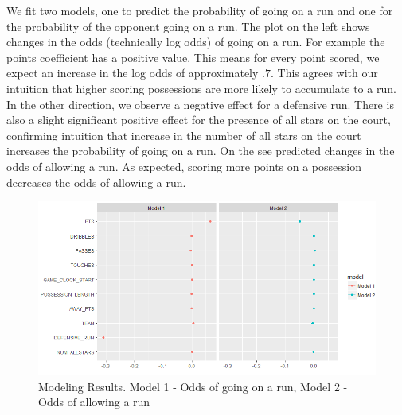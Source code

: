 \documentclass{article}
\begin{document}
We fit two models, one to predict the probability of going on a run and one for the probability of the opponent going on a run. The plot on the left shows changes in the odds (technically log odds) of going on a run. For example the points coefficient has a positive value. This means for every point scored, we expect an increase in the log odds of approximately $.7$. This agrees with our intuition that higher scoring possessions are more likely to accumulate to a run. In the other direction, we observe a negative effect for a defensive run. There is also a slight significant positive effect for the presence of all stars on the court, confirming intuition that increase in the number of all stars on the court increases the probability of going on a run. On the see predicted changes in the odds of allowing a run. As expected, scoring more points on a possession decreases the odds of allowing a run.

\begin{figure}[h]
\begin{center}
\includegraphics[width=175mm]{results2.png}
\caption{Modeling Results. Model 1 - Odds of going on a run, Model 2 - Odds of allowing a run}
\end{center}
\end{figure}
\end{document}
